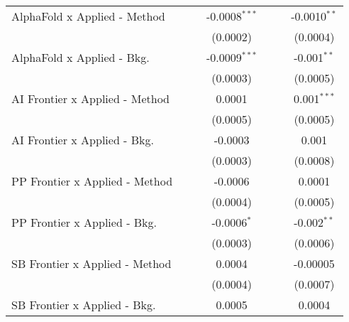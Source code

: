 \begin{tabular}{lcccccc}
   AlphaFold x Applied - Method   &                 &                 & -0.0008$^{***}$ &                 &                & -0.0010$^{**}$\\   
                                  &                 &                 & (0.0002)        &                 &                & (0.0004)\\   
   AlphaFold x Applied - Bkg.     &                 &                 & -0.0009$^{***}$ &                 &                & -0.001$^{**}$\\   
                                  &                 &                 & (0.0003)        &                 &                & (0.0005)\\   
   AI Frontier x Applied - Method &                 &                 & 0.0001          &                 &                & 0.001$^{***}$\\   
                                  &                 &                 & (0.0005)        &                 &                & (0.0005)\\   
   AI Frontier x Applied - Bkg.   &                 &                 & -0.0003         &                 &                & 0.001\\   
                                  &                 &                 & (0.0003)        &                 &                & (0.0008)\\   
   PP Frontier x Applied - Method &                 &                 & -0.0006         &                 &                & 0.0001\\   
                                  &                 &                 & (0.0004)        &                 &                & (0.0005)\\   
   PP Frontier x Applied - Bkg.   &                 &                 & -0.0006$^{*}$   &                 &                & -0.002$^{**}$\\   
                                  &                 &                 & (0.0003)        &                 &                & (0.0006)\\   
   SB Frontier x Applied - Method &                 &                 & 0.0004          &                 &                & -0.00005\\   
                                  &                 &                 & (0.0004)        &                 &                & (0.0007)\\   
   SB Frontier x Applied - Bkg.   &                 &                 & 0.0005          &                 &                & 0.0004\\   

\end{tabular}

